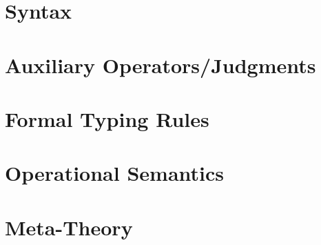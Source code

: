 \DoToC
\section{Syntax}


\section{Auxiliary Operators/Judgments}


\section{Formal Typing Rules}


\section{Operational Semantics}\label{appendix:semantics}


\section{Meta-Theory}\label{appendix:metatheory}
